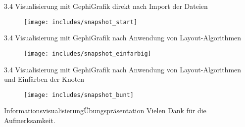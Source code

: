 \documentclass[%
11pt,a4paper,xcolor={usenames,dvipsnames}]{beamer}
\begin{document}
    \begin{frame}{3.4 Visualisierung mit Gephi}{Grafik direkt nach Import der Dateien}
        \begin{figure}
    		\centering
    		\texttt{[image: includes/snapshot\_start]}
		\end{figure}
    \end{frame}
    
    \begin{frame}{3.4 Visualisierung mit Gephi}{Grafik nach Anwendung von Layout-Algorithmen}
       \begin{figure}
    		\centering
    		\texttt{[image: includes/snapshot\_einfarbig]}
		\end{figure}
    \end{frame}
    
    \begin{frame}{3.4 Visualisierung mit Gephi}{Grafik nach Anwendung von Layout-Algorithmen und Einfärben der Knoten}
       \begin{figure}
    		\centering
    		\texttt{[image: includes/snapshot\_bunt]}
		\end{figure}
    \end{frame}
    
    \begin{frame}{Informationsvisualisierung}{Übungspräsentation}
    	Vielen Dank für die Aufmerksamkeit.
    \end{frame}
\end{document}
